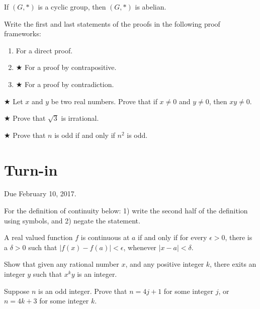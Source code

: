 \documentclass[12pt]{article}
\begin{document}
\begin{qu}
If $(G, \ast)$ is a cyclic group, then $(G, \ast)$ is abelian.

Write the first and last statements of the proofs in the following proof frameworks:
\begin{enumerate}[label=\alph*)]
\item For a direct proof.
\item $\bigstar$ For a proof by contrapositive.
\item $\bigstar$ For a proof by contradiction.
\end{enumerate}
\end{qu}

\begin{qu} $\bigstar$
Let $x$ and $y$ be two real numbers. Prove that if $x \ne 0$ and $y \ne 0$, then $xy \ne 0$.
\end{qu}

\begin{qu} $\bigstar$
Prove that $\sqrt{3}$ is irrational.
\end{qu}

\begin{qu} $\bigstar$
Prove that $n$ is odd if and only if $n^2$ is odd. \end{qu}

\newpage
\section{Turn-in}

Due February 10, 2017.



\begin{qu} For the definition of continuity below: 1) write the second half of the definition using symbols, and 2) negate the statement.

\begin{framed}
A real valued function $f$ is continuous at $a$ if and only if
for every $\epsilon >0$, there is a $\delta >0$ such that $|f(x)-f(a)|<\epsilon$, whenever $|x-a|< \delta$. \end{framed}

\end{qu}


\begin{qu}
Show that given any rational number $x$, and any positive integer $k$, there exits an integer $y$ such that $x^k y$ is an integer.
\end{qu}

\begin{qu}Suppose $n$ is an odd integer. Prove that $n=4j+1$ for some integer $j$, or $n=4k+3$ for some integer $k$.
\end{qu}
\end{document}
